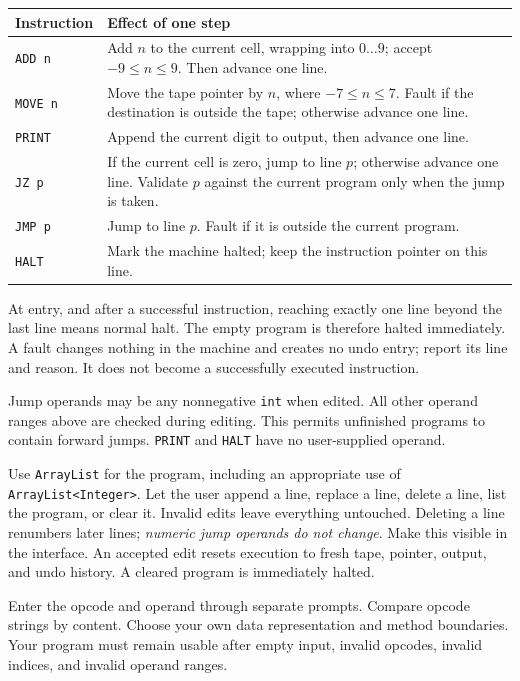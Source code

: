 \documentclass[11pt,a4paper]{article}
\newcommand{\code}[1]{\texttt{#1}}
\newcommand{\sub}[1]{\par\vspace{5pt}{\large\sffamily\bfseries\color{ink}#1}\par\vspace{1pt}}
\begin{document}
\begin{tabularx}{\linewidth}{@{}p{27mm}Y@{}}
\toprule
\textbf{Instruction} & \textbf{Effect of one step}\\
\midrule
\code{ADD n} & Add $n$ to the current cell, wrapping into $0\ldots9$; accept $-9\leq n\leq9$. Then advance one line.\\
\code{MOVE n} & Move the tape pointer by $n$, where $-7\leq n\leq7$. Fault if the destination is outside the tape; otherwise advance one line.\\
\code{PRINT} & Append the current digit to output, then advance one line.\\
\code{JZ p} & If the current cell is zero, jump to line $p$; otherwise advance one line. Validate $p$ against the current program only when the jump is taken.\\
\code{JMP p} & Jump to line $p$. Fault if it is outside the current program.\\
\code{HALT} & Mark the machine halted; keep the instruction pointer on this line.\\
\bottomrule
\end{tabularx}
At entry, and after a successful instruction, reaching exactly one line beyond the last line means normal halt. The empty program is therefore halted immediately. A fault changes nothing in the machine and creates no undo entry; report its line and reason. It does not become a successfully executed instruction.

Jump operands may be any nonnegative \code{int} when edited. All other operand ranges above are checked during editing. This permits unfinished programs to contain forward jumps. \code{PRINT} and \code{HALT} have no user-supplied operand.

\sub{The editor contract}
Use \code{ArrayList} for the program, including an appropriate use of \code{ArrayList<Integer>}. Let the user append a line, replace a line, delete a line, list the program, or clear it. Invalid edits leave everything untouched. Deleting a line renumbers later lines; \emph{numeric jump operands do not change}. Make this visible in the interface. An accepted edit resets execution to fresh tape, pointer, output, and undo history. A cleared program is immediately halted.

Enter the opcode and operand through separate prompts. Compare opcode strings by content. Choose your own data representation and method boundaries. Your program must remain usable after empty input, invalid opcodes, invalid indices, and invalid operand ranges.
\end{document}
